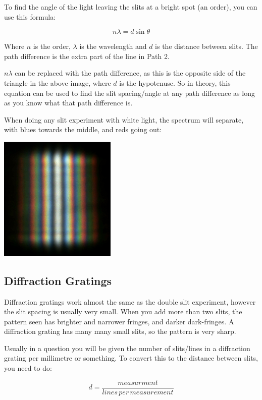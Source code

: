 \documentclass[a4paper, 12pt]{article}
\begin{document}
To find the angle of the light leaving the slits at a bright spot (an order), you can use this formula:

$$
n\lambda = d\sin\theta
$$

Where $n$ is the order, $\lambda$ is the wavelength and $d$ is the distance between slits. The path difference is the extra part of the line in Path 2.

$n{\lambda}$ can be replaced with the path difference, as this is the opposite side of the triangle in the above image, where $d$ is the hypotenuse. So in theory, this equation can be used to find the slit spacing/angle at any path difference as long as you know what that path difference is.

When doing any slit experiment with white light, the spectrum will separate, with blues towards the middle, and reds going out:

\begin{center}
\includegraphics[height=6cm]{images/doubleSlitWhite.png}
\end{center}

\subsection{Diffraction Gratings}

Diffraction gratings work almost the same as the double slit experiment, however the slit spacing is usually very small. When you add more than two slits, the pattern seen has brighter and narrower fringes, and darker dark-fringes. A diffraction grating has many many small slits, so the pattern is very sharp.

Usually in a question you will be given the number of slits/lines in a diffraction grating per millimetre or something. To convert this to the distance between slits, you need to do:

$$
d = \frac{measurment}{lines \, per \, measurement}
$$
\end{document}
